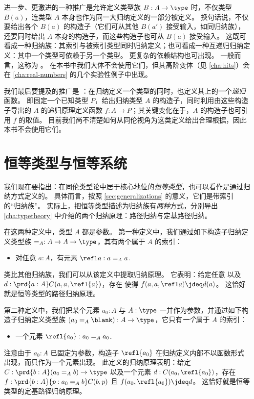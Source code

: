 %
%
进一步、更激进的一种推广是允许定义类型族 $B:A\to \type$ 时，不仅类型 $B(a)$，连类型 $A$ 本身也作为同一大归纳定义的一部分被定义。
换句话说，不仅要给出各个 $B(a)$ 的构造子（它们可从其他 $B(a')$ 接受输入，如同归纳族），还要同时给出 $A$ 本身的构造子，而这些构造子也可从 $B(a)$ 接受输入。
这既可看成一种归纳族：其索引与被索引类型同时归纳定义；也可看成一种互递归归纳定义：其中一个类型可依赖于另一个类型。
更复杂的依赖结构也可出现。
一般而言，这称为 。
在本书中我们大体不会使用它们，但其高阶变体（见 \cref{cha:hits}）会在 \cref{cha:real-numbers} 的几个实验性例子中出现。

%
%
我们最后要提及的推广是 ：在归纳定义一个类型的同时，也定义其上的一个\emph{递归}函数。
即固定一个已知类型 $P$，给出归纳类型 $A$ 的构造子，同时利用由这些构造子导出的 $A$ 的递归原理定义函数 $f:A\to P$；其关键变化在于，$A$ 的构造子也可引用 $f$ 的取值。
目前我们尚不清楚如何从同伦视角为这类定义给出合理根据，因此本书不会使用它们。

%

\section{恒等类型与恒等系统}
\label{sec:identity-systems}

%
我们现在要指出：在同伦类型论中居于核心地位的\emph{恒等类型}，也可以看作是通过归纳方式定义的。
具体而言，按照 \cref{sec:generalizations} 的意义，它们是带索引的“归纳族”。
实际上，把恒等类型描述为归纳族有\emph{两种}方式，分别导出
\cref{cha:typetheory} 中介绍的两个归纳原理：路径归纳与定基路径归纳。

在这两种定义中，类型 $A$ 都是参数。
第一种定义中，我们通过如下构造子归纳定义类型族 $=_A : A\to A\to \type$，其有两个属于 $A$ 的索引：
\begin{itemize}
\item 对任意 $a:A$，有元素 $\refl a : a=_A a$.
\end{itemize}
类比其他归纳族，我们可以从该定义中提取归纳原理。
它表明：给定任意  以及 $d:\prd{a:A} C(a,a,\refl{a})$，存在  使得 $f(a,a,\refl a)\jdeq d(a)$。
这恰好就是恒等类型的路径归纳原理。

第二种定义中，我们把某个元素 $a_0:A$ 与 $A:\type$ 一并作为参数，并通过如下构造子归纳定义类型族 $(a_0 =_A \blank):A\to \type$，它只有\emph{一个}属于 $A$ 的索引：
\begin{itemize}
\item 一个元素 $\refl{a_0} : a_0 =_A a_0$.
\end{itemize}
注意由于 $a_0:A$ 已固定为参数，构造子 $\refl{a_0}$ 在归纳定义内部不以函数形式出现，而只作为一个元素出现。
此定义的归纳原理表明：给定 $C:\prd{b:A} (a_0 =_A b) \to \type$ 以及一个元素 $d:C(a_0,\refl{a_0})$，存在 $f:\prd{b:A}{p:a_0 =_A b} C(b,p)$ 且 $f(a_0,\refl{a_0})\jdeq d$。
这恰好就是恒等类型的定基路径归纳原理。

